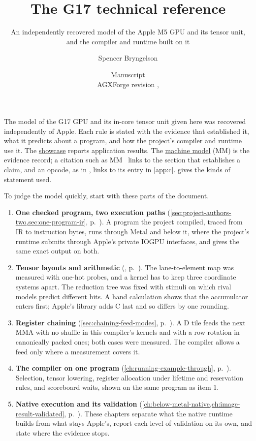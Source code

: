 \documentclass[11pt, letterpaper, oneside, open=any, numbers=noenddot]{scrreprt}
\title{\Huge The G17 technical reference}
\subtitle{An independently recovered model of the Apple M5 GPU and its tensor unit,\\
and the compiler and runtime built on it}
\author{Spencer Bryngelson}
\date{Manuscript\\[2pt]\small AGXForge revision \code{\docrevision}\ifx\docrevdate\empty\else, \docrevdate\fi}
\begin{document}
\maketitle


The model of the G17 GPU and its in-core tensor unit given here was recovered independently of Apple. Each rule is
stated with the evidence that established it, what it predicts about a program, and how the project's compiler and
runtime use it. The
\href{https://github.com/sbryngelson/AGXForge/blob/main/docs/showcase.md}{showcase} reports application results. The
\href{https://github.com/sbryngelson/AGXForge/blob/main/docs/g17-tensorops-machine-model.md}{machine model} (MM) is the
evidence record; a citation such as MM~ links to the section that establishes a claim, and an opcode, as in
, links to its entry in \cref{app:c}.  gives the kinds of statement used.

To judge the model quickly, start with these parts of the document.

\begin{enumerate}[leftmargin=1.6em, itemsep=4pt]
\item \textbf{One checked program, two execution paths} (\cref{sec:project-authors-two,sec:one-program-ir},
  p.~\pageref{sec:project-authors-two}). A program the project compiled, traced from IR to instruction bytes, runs through
  Metal and below it, where the project's runtime submits through Apple's private IOGPU interfaces, and gives the same
  exact output on both.
\item \textbf{Tensor layouts and arithmetic} (,
  p.~\pageref{sec:fragment-layouts}). The lane-to-element map was measured with one-hot probes, and a kernel has to keep
  three coordinate systems apart. The reduction tree was fixed with stimuli on which rival models predict different bits.
  A hand calculation shows that the accumulator enters first; Apple's library adds C last and so differs by one
  rounding.
\item \textbf{Register chaining} (\cref{sec:chaining-feed-modes}, p.~\pageref{sec:chaining-feed-modes}). A D tile
  feeds the next MMA with no shuffle in this compiler's kernels and with a row rotation in canonically packed ones; both
  cases were measured. The compiler allows a feed only where a measurement covers it.
\item \textbf{The compiler on one program} (\cref{ch:running-example-through}, p.~\pageref{ch:running-example-through}).
  Selection, tensor lowering, register allocation under lifetime and reservation rules, and scoreboard waits, shown on
  the same program as item 1.
\item \textbf{Native execution and its validation} (\cref{ch:below-metal-native,ch:image-result-validated},
  p.~\pageref{ch:below-metal-native}). These chapters separate what the native runtime builds from what stays Apple's,
  report each level of validation on its own, and state where the evidence stops.
\end{enumerate}
\end{document}

